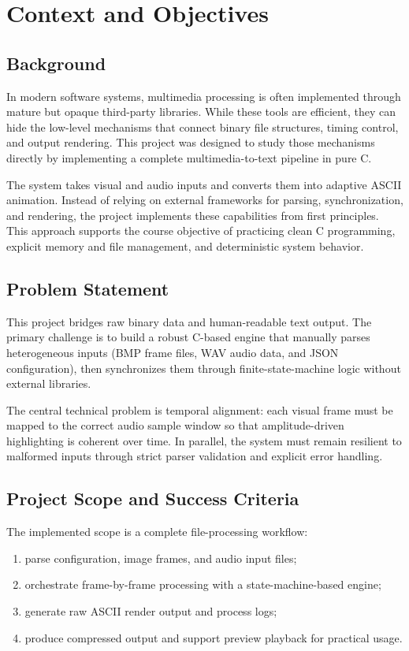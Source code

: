 \section{Context and Objectives}

\subsection{Background}
In modern software systems, multimedia processing is often implemented through mature but opaque third-party libraries. While these tools are efficient, they can hide the low-level mechanisms that connect binary file structures, timing control, and output rendering. This project was designed to study those mechanisms directly by implementing a complete multimedia-to-text pipeline in pure C.

The system takes visual and audio inputs and converts them into adaptive ASCII animation. Instead of relying on external frameworks for parsing, synchronization, and rendering, the project implements these capabilities from first principles. This approach supports the course objective of practicing clean C programming, explicit memory and file management, and deterministic system behavior.

\subsection{Problem Statement}
This project bridges raw binary data and human-readable text output. The primary challenge is to build a robust C-based engine that manually parses heterogeneous inputs (BMP frame files, WAV audio data, and JSON configuration), then synchronizes them through finite-state-machine logic without external libraries.

The central technical problem is temporal alignment: each visual frame must be mapped to the correct audio sample window so that amplitude-driven highlighting is coherent over time. In parallel, the system must remain resilient to malformed inputs through strict parser validation and explicit error handling.

\subsection{Project Scope and Success Criteria}
The implemented scope is a complete file-processing workflow:
\begin{enumerate}[label=\arabic*)]
    \item parse configuration, image frames, and audio input files;
    \item orchestrate frame-by-frame processing with a state-machine-based engine;
    \item generate raw ASCII render output and process logs;
    \item produce compressed output and support preview playback for practical usage.
\end{enumerate}

